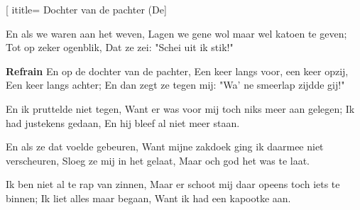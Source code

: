  [
ititle= {Dochter van de pachter (De}]

\beginverse
En als we waren aan het weven,
Lagen we gene wol maar wel katoen te geven;
Tot op zeker ogenblik,
Dat ze zei: "Schei uit ik stik!"
\endverse

\beginchorus
\textbf {Refrain}
En op de dochter van de pachter,
Een keer langs voor, een keer opzij,
Een keer langs achter;
En dan zegt ze tegen mij:
"Wa' ne smeerlap zijdde gij!"
\endchorus

\beginverse
En ik pruttelde niet tegen,
Want er was voor mij toch niks meer aan gelegen;
Ik had justekens gedaan,
En hij bleef al niet meer staan.
\endverse

\beginverse
En als ze dat voelde gebeuren,
Want mijne zakdoek ging ik daarmee niet verscheuren,
Sloeg ze mij in het gelaat,
Maar och god het was te laat.
\endverse

\beginverse
Ik ben niet al te rap van zinnen,
Maar er schoot mij daar opeens toch iets te binnen;
Ik liet alles maar begaan,
Want ik had een kapootke aan.
\endverse

\endsong